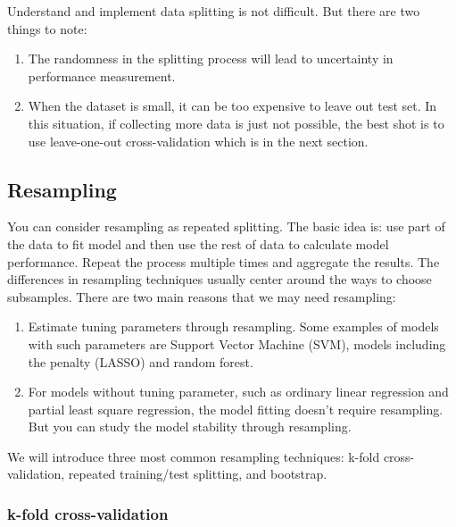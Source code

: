 \documentclass[12pt,]{krantz}
\providecommand{\tightlist}{%
  \setlength{\itemsep}{0pt}\setlength{\parskip}{0pt}}
\begin{document}
Understand and implement data splitting is not difficult. But there are two things to note:

\begin{enumerate}
\def\labelenumi{\arabic{enumi}.}
\tightlist
\item
  The randomness in the splitting process will lead to uncertainty in performance measurement.
\item
  When the dataset is small, it can be too expensive to leave out test set. In this situation, if collecting more data is just not possible, the best shot is to use leave-one-out cross-validation which is in the next section.
\end{enumerate}

\hypertarget{resampling}{%
\subsection{Resampling}\label{resampling}}

You can consider resampling as repeated splitting. The basic idea is: use part of the data to fit model and then use the rest of data to calculate model performance. Repeat the process multiple times and aggregate the results. The differences in resampling techniques usually center around the ways to choose subsamples. There are two main reasons that we may need resampling:

\begin{enumerate}
\def\labelenumi{\arabic{enumi}.}
\item
  Estimate tuning parameters through resampling. Some examples of models with such parameters are Support Vector Machine (SVM), models including the penalty (LASSO) and random forest.
\item
  For models without tuning parameter, such as ordinary linear regression and partial least square regression, the model fitting doesn't require resampling. But you can study the model stability through resampling.
\end{enumerate}

We will introduce three most common resampling techniques: k-fold cross-validation, repeated training/test splitting, and bootstrap.

\hypertarget{k-fold-cross-validation}{%
\subsubsection{k-fold cross-validation}\label{k-fold-cross-validation}}
\end{document}

